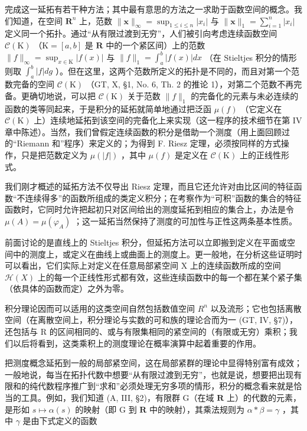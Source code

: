 完成这一延拓有若干种方法；其中最有意思的方法之一求助于函数空间的概念。我们知道，在空间 \(\mathbf{R}^n\) 上，范数 \(\| \mathbf{x}\|_{\infty} = \sup_{1\leqslant i\leqslant n}|x_i|\) 与 \(\| \mathbf{x}\|_1 = \sum_{i=1}^{n}|x_i|\) 定义同一个拓扑。通过“从有限过渡到无穷”，人们被引向考虑连续函数空间 \(\mathcal{C}(\mathrm{K})\) （\(\mathrm{K} = [a,b]\) 是 \(\mathbf{R}\) 中的一个紧区间）上的范数 \(\| f\|_{\infty} = \sup_{x\in \mathrm{K}}|f(x)|\) 与 \(\| f\|_1 = \int_a^b |f(x)|dx\) （在 Stieltjes 积分的情形则取 \(\int_a^b |f|dg\) ）。但在这里，这两个范数所定义的拓扑是不同的，而且对第一个范数完备的空间 \(\mathcal{C}(\mathrm{K})\) （GT, X, §1, No. 6, Th. 2 的推论 1），对第二个范数不再完备。更确切地说，可以把 \(\mathcal{C}(\mathrm{K})\) 关于范数 \(\| f\|_1\) 的完备化的元素与未必连续的函数的类等同起来，于是积分的延拓就简单地通过把泛函 \(\mu(f)\) （它定义在 \(\mathcal{C}(\mathrm{K})\) 上）连续地延拓到该空间的完备化上来实现（这一程序的技术细节在第 IV 章中陈述）。当然，我们曾假定连续函数的积分是借助一个测度（用上面回顾过的“Riemann 和”程序）来定义的；为得到 F. Riesz 定理，必须按同样的方式操作，只是把范数定义为 \(\mu(|f|)\) ，其中 \(\mu(f)\) 是定义在 \(\mathcal{C}(\mathrm{K})\) 上的正线性形式。

我们刚才概述的延拓方法不仅导出 Riesz 定理，而且它还允许对由比区间的特征函数“不连续得多”的函数所组成的类定义积分；在考察作为“可积”函数的集合的特征函数时，它同时允许把起初只对区间给出的测度延拓到相应的集合上，办法是令 \(\mu(A) = \mu(\varphi_A)\) ；这一延拓当然保持了测度的可加性与正性这两条基本性质。

前面讨论的是直线上的 Stieltjes 积分，但延拓方法可以立即搬到定义在平面或空间中的测度上，或定义在曲线上或曲面上的测度上。更一般地，在分析这些证明时可以看出，它们实际上对定义在任意局部紧空间 X 上的连续函数所成的空间 \(\mathcal{H}(X)\) 上的每一个正线性形式都有效，这些连续函数中的每一个都在某个紧子集（依具体的函数而定）之外为零。

积分理论因而可以适用的这类空间自然包括数值空间 \(R^{n}\) 以及流形；它也包括离散空间（在离散空间上，积分理论与实数的可和族的理论合而为一 (GT, IV, §7)），还包括与 R 的区间相同的、或与有限集相同的紧空间的（有限或无穷）乘积；我们以后将看到，这类乘积上的测度理论在概率演算中起着重要的作用。

把测度概念延拓到一般的局部紧空间，这在局部紧群的理论中显得特别富有成效；一般地说，每当在拓扑代数中想要“从有限过渡到无穷”，也就是说，想要把出现有限和的纯代数程序推广到“求和”必须处理无穷多项的情形，积分的概念看来就是恰当的工具。例如，我们知道 (A, III, §2)，有限群 G（在域 \(\mathbf{R}\) 上）的代数的元素，是形如 \(s \mapsto \alpha(s)\) 的映射（即 G 到 \(\mathbf{R}\) 中的映射），其乘法规则为 \(\alpha * \beta = \gamma\) ，其中 \(\gamma\) 是由下式定义的函数

